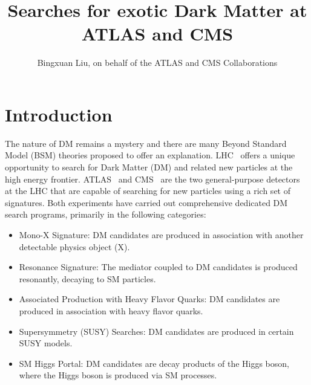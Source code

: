\documentclass{moriond}
\begin{document}
\vspace*{0cm}
\title{Searches for exotic Dark Matter at ATLAS and CMS}


\author{Bingxuan Liu, on behalf of the ATLAS and CMS Collaborations}

\address{Department of Physics, Simon Fraser University, Vancouver, Canada}

\maketitle{}

\section{Introduction}

The nature of DM remains a mystery and there are many Beyond Standard Model
(BSM) theories proposed to offer an explanation. LHC~\cite{LHCRef} offers a
unique opportunity to search for Dark Matter (DM) and related new particles at
the high energy frontier.  ATLAS~\cite{ATLASRef} and CMS~\cite{CMSRef} are the
two general-purpose detectors at the LHC that are capable of searching for new
particles using a rich set of signatures. Both experiments have carried out
comprehensive dedicated DM search programs, primarily in the following
categories: 

\begin{itemize}
\item Mono-X Signature: DM candidates are produced in association with another detectable physics object (X). 
\item Resonance Signature: The mediator coupled to DM candidates is produced resonantly, decaying to SM particles.
\item Associated Production with Heavy Flavor Quarks: DM candidates are produced in association with heavy flavor quarks.
\item Supersymmetry (SUSY) Searches: DM candidates are produced in certain SUSY models.
\item SM Higgs Portal: DM candidates are decay products of the Higgs boson, where the Higgs boson is produced via SM processes. 
\end{itemize}    
\end{document}

